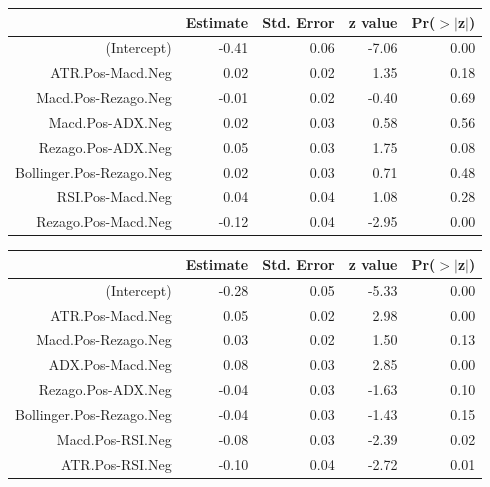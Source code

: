 \documentclass[a4paper,12pt]{Latex/Classes/PhDthesisPSnPDF}
\begin{document}
\begin{center}
\begin{table}[ht]
\centering
\begin{tabular}{rrrrr}
  \hline
 & Estimate & Std. Error & z value & Pr($>$$|$z$|$) \\ 
  \hline
(Intercept) & -0.41 & 0.06 & -7.06 & 0.00 \\ 
  ATR.Pos-Macd.Neg & 0.02 & 0.02 & 1.35 & 0.18 \\ 
  Macd.Pos-Rezago.Neg & -0.01 & 0.02 & -0.40 & 0.69 \\ 
  Macd.Pos-ADX.Neg & 0.02 & 0.03 & 0.58 & 0.56 \\ 
  Rezago.Pos-ADX.Neg & 0.05 & 0.03 & 1.75 & 0.08 \\ 
  Bollinger.Pos-Rezago.Neg & 0.02 & 0.03 & 0.71 & 0.48 \\ 
  RSI.Pos-Macd.Neg & 0.04 & 0.04 & 1.08 & 0.28 \\ 
  Rezago.Pos-Macd.Neg & -0.12 & 0.04 & -2.95 & 0.00 \\ 
   \hline
\end{tabular}
\end{table}\end{center}

\newpage
\begin{center}
\begin{table}[ht]
\centering
\begin{tabular}{rrrrr}
  \hline
 & Estimate & Std. Error & z value & Pr($>$$|$z$|$) \\ 
  \hline
(Intercept) & -0.28 & 0.05 & -5.33 & 0.00 \\ 
  ATR.Pos-Macd.Neg & 0.05 & 0.02 & 2.98 & 0.00 \\ 
  Macd.Pos-Rezago.Neg & 0.03 & 0.02 & 1.50 & 0.13 \\ 
  ADX.Pos-Macd.Neg & 0.08 & 0.03 & 2.85 & 0.00 \\ 
  Rezago.Pos-ADX.Neg & -0.04 & 0.03 & -1.63 & 0.10 \\ 
  Bollinger.Pos-Rezago.Neg & -0.04 & 0.03 & -1.43 & 0.15 \\ 
  Macd.Pos-RSI.Neg & -0.08 & 0.03 & -2.39 & 0.02 \\ 
  ATR.Pos-RSI.Neg & -0.10 & 0.04 & -2.72 & 0.01 \\ 
   \hline
\end{tabular}
\end{table}\end{center}
\end{document}
